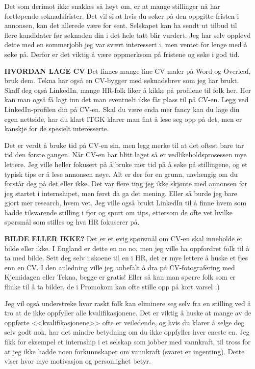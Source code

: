 Det som derimot ikke snakkes så høyt om, er at mange stillinger nå har fortløpende søknadsfrister. Det vil si at hvis du søker på den oppgitte fristen i annonsen, kan det allerede være for sent. Selskapet kan ha sendt ut tilbud til flere kandidater før søknaden din i det hele tatt blir vurdert. Jeg har selv opplevd dette med en sommerjobb jeg var svært interessert i, men ventet for lenge med å søke på. Derfor er det viktig å være oppmerksom på fristene og søke i god tid.

\begin{remark}
    \textbf{HVORDAN LAGE CV} Det finnes mange fine CV-maler på Word og Overleaf, bruk dem. Tekna har også en CV-bygger med søknadsbrev som jeg har brukt. Skaff deg også LinkedIn, mange HR-folk liker å kikke på profilene til folk her. Her kan man også få lagt inn det man eventuelt ikke får plass til på CV-en. Legg ved LinkedIn-profilen din på CV-en. Skal du være enda mer fancy kan du lage din egen nettside, har du klart ITGK klarer man fint å lese seg opp på det, men er kanskje for de spesielt interesserte. 
\end{remark}

Det er verdt å bruke tid på CV-en sin, men legg merke til at det oftest bare tar tid den første gangen. Når CV-en har blitt laget så er vedlikeholdsprosessen mye lettere. Jeg ville heller fokusert på å bruke mer tid på å søke på stillingene, og et typisk tips er å lese annonsen nøye. Alt er der for en grunn, uavhengig om du forstår deg på det eller ikke. Det var flere ting jeg ikke skjønte med annonsen før jeg startet i internshipet, men først da ga det mening. Eller så burde jeg bare gjort mer research, hvem vet. Jeg ville også brukt LinkedIn til å finne hvem som hadde tilsvarende stilling i fjor og spurt om tips, ettersom de ofte vet hvilke spørsmål som stilles og hva HR fokuserer på. 

\begin{remark}
    \textbf{BILDE ELLER IKKE?} Det er et evig spørsmål om CV-en skal inneholde et bilde eller ikke. I England er dette en no no, men jeg ville ha oppfordret folk til å ta med bilde. Sett deg selv i skoene til en i HR, det er mye lettere å huske et fjes enn en CV. I den anledning ville jeg anbefalt å dra på CV-fotografering med Kjemidagen eller Tekna, begge er gratis! Eller så kan man spørre folk som er flinke til å ta bilder, de i Promokom kan ofte stille opp på kort varsel ;)
\end{remark}

Jeg vil også understreke hvor raskt folk kan eliminere seg selv fra en stilling ved å tro at de ikke oppfyller alle kvalifikasjonene. Det er viktig å huske at mange av de oppførte <<kvalifikasjonene>> ofte er veiledende, og hvis du klarer å selge deg selv godt nok, har det mindre betydning om du ikke oppfyller hver eneste en. Jeg fikk for eksempel et internship i et selskap som jobber med vannkraft, til tross for at jeg ikke hadde noen forkunnskaper om vannkraft (svaret er ingenting). Dette viser hvor mye motivasjon og personlighet betyr.

